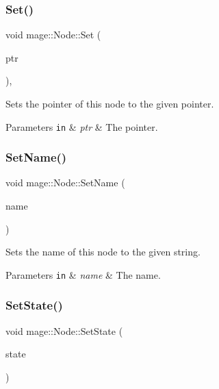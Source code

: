 \subsubsection{\texorpdfstring{Set()}{Set()}}
{\footnotesize\ttfamily void mage\+::\+Node\+::\+Set (\begin{DoxyParamCaption}\item[{\hyperlink{classmage_1_1_node_ac575dc006e0ae1134277ade977dc06b6}{Node\+Ptr}}]{ptr }\end{DoxyParamCaption})\hspace{0.3cm}{\ttfamily [private]}, {\ttfamily [noexcept]}}

Sets the pointer of this node to the given pointer.


\begin{DoxyParams}[1]{Parameters}
\mbox{\tt in}  & {\em ptr} & The pointer. \\
\hline
\end{DoxyParams}
\hypertarget{classmage_1_1_node_a78e4ef8457d200662d2f4881cef08688}{}\label{classmage_1_1_node_a78e4ef8457d200662d2f4881cef08688} 
\subsubsection{\texorpdfstring{Set\+Name()}{SetName()}}
{\footnotesize\ttfamily void mage\+::\+Node\+::\+Set\+Name (\begin{DoxyParamCaption}\item[{string}]{name }\end{DoxyParamCaption})\hspace{0.3cm}{\ttfamily [noexcept]}}

Sets the name of this node to the given string.


\begin{DoxyParams}[1]{Parameters}
\mbox{\tt in}  & {\em name} & The name. \\
\hline
\end{DoxyParams}
\hypertarget{classmage_1_1_node_a9511a52ddcc0bba71a0353338dcd1d9b}{}\label{classmage_1_1_node_a9511a52ddcc0bba71a0353338dcd1d9b} 
\subsubsection{\texorpdfstring{Set\+State()}{SetState()}}
{\footnotesize\ttfamily void mage\+::\+Node\+::\+Set\+State (\begin{DoxyParamCaption}\item[{\hyperlink{namespacemage_ae47d13d8477ee94893b9a3947d28eebc}{State}}]{state }\end{DoxyParamCaption})\hspace{0.3cm}{\ttfamily [noexcept]}}

